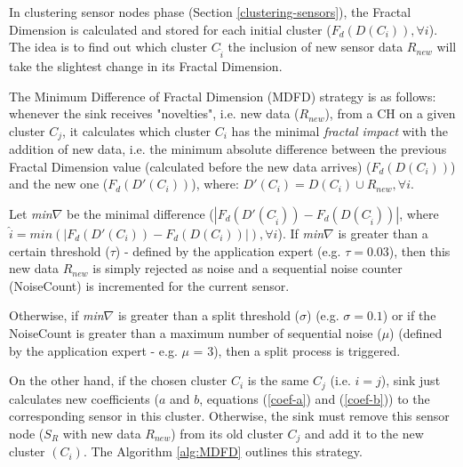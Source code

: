 \documentclass{acm_proc_article-sp}
\begin{document}
In clustering sensor nodes phase (Section \ref{clustering-sensors}), the Fractal
Dimension is calculated and stored for each initial cluster ($F_{d}(D(C_i)),
\forall i$). The idea is to find out which cluster $C_{\hat{i}}$ the inclusion
of new sensor data $R_{new}$ will take the slightest change in its Fractal
Dimension.


The Minimum Difference of Fractal Dimension (MDFD) strategy is as follows:
whenever the sink receives "novelties", i.e. new data ($R_{new}$), from a CH on
a given cluster $C_j$, it calculates which cluster $C_i$ has the minimal
\textit{fractal impact} with the addition of new data, i.e. the minimum absolute
difference between the previous Fractal Dimension value (calculated before the
new data arrives) ($F_d(D(C_i))$) and the new one ($F_d(D'(C_i))$), where:
$D'(C_i) = D(C_i) \cup R_{new}, \forall i$.

Let {\it min}$\nabla$ be the minimal difference ($|F_d(D'(C_{\hat{i}})) -
F_d(D(C_{\hat{i}}))|$, where $\hat{i} = min(|F_d(D'(C_i)) - F_d(D(C_i))|),
\forall i$). If {\it min}$\nabla$ is greater than a certain threshold ($\tau$) -
defined by the application expert (e.g. $\tau = 0.03$), then this new data
$R_{new}$ is simply rejected as noise and a sequential noise counter (NoiseCount)
is incremented for the current sensor.

Otherwise, if {\it min}$\nabla$ is greater than a split threshold ($\sigma$)
(e.g. $\sigma = 0.1$) or if the NoiseCount is greater than a maximum number of
sequential noise ($\mu$) (defined by the application expert - e.g. $\mu$ = 3),
then a split process is triggered.

On the other hand, if the chosen cluster $C_i$ is the same $C_j$ (i.e.
$i=j$), sink just calculates new coefficients ($a$ and $b$, equations (\ref{coef-a})
and (\ref{coef-b})) to the corresponding sensor in this cluster. Otherwise, the sink
must remove this sensor node ($S_{R}$ with new data $R_{new}$) from its old
cluster $C_j$ and add it to the new cluster $(C_i)$.
The Algorithm \ref{alg:MDFD} outlines this strategy.
\end{document}
